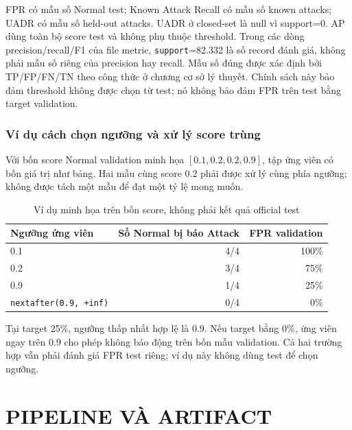 \documentclass[12pt,a4paper,oneside]{report}
\begin{document}
FPR có mẫu số Normal test; Known Attack Recall có mẫu số known attacks; UADR có mẫu số held-out attacks. UADR ở closed-set là null vì support=0. AP dùng toàn bộ score test và không phụ thuộc threshold. Trong các dòng precision/recall/F1 của file metric, \texttt{support}=82.332 là số record đánh giá, không phải mẫu số riêng của precision hay recall. Mẫu số đúng được xác định bởi TP/FP/FN/TN theo công thức ở chương cơ sở lý thuyết. Chính sách này bảo đảm threshold không được chọn từ test; nó không bảo đảm FPR trên test bằng target validation.



\subsection{Ví dụ cách chọn ngưỡng và xử lý score trùng}
Với bốn score Normal validation minh họa $[0.1,0.2,0.2,0.9]$, tập ứng viên có bốn giá trị như bảng. Hai mẫu cùng score 0.2 phải được xử lý cùng phía ngưỡng; không được tách một mẫu để đạt một tỷ lệ mong muốn.
\begin{table}[H]\centering\small
\caption{Ví dụ minh họa trên bốn score, không phải kết quả official test}
\begin{tabular}{lrr}\toprule
Ngưỡng ứng viên & Số Normal bị báo Attack & FPR validation\\\midrule
0.1 & 4/4 & 100\%\\
0.2 & 3/4 & 75\%\\
0.9 & 1/4 & 25\%\\
\texttt{nextafter(0.9, +inf)} & 0/4 & 0\%\\\bottomrule
\end{tabular}\end{table}
Tại target 25\%, ngưỡng thấp nhất hợp lệ là 0.9. Nếu target bằng 0\%, ứng viên ngay trên 0.9 cho phép không báo động trên bốn mẫu validation. Cả hai trường hợp vẫn phải đánh giá FPR test riêng; ví dụ này không dùng test để chọn ngưỡng.

\chapter{PIPELINE VÀ ARTIFACT}
\end{document}
